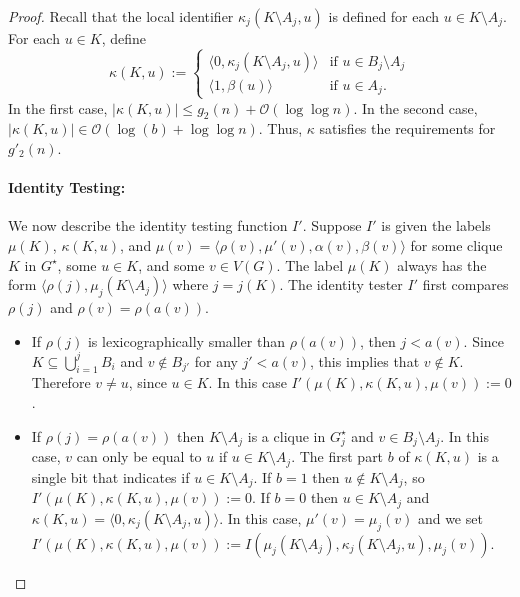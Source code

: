\documentclass{patmorin}
\renewcommand{\le}{\leqslant}
\newcommand{\Oh}{\mathcal{O}}
\begin{document}
\begin{proof}
    Recall that the local identifier $\kappa_j(K\setminus A_j,u)$ is defined for each $u\in K\setminus A_j$.
    For each $u\in K$, define
    \[
         \kappa(K,u):=
         \begin{cases}
           \langle 0,\kappa_j(K\setminus A_j,u)\rangle & \text{if $u\in B_j\setminus A_j$} \\
           \langle 1,\beta(u)\rangle & \text{if $u\in A_j$.}
         \end{cases}
     \]
     In the first case, $|\kappa(K,u)|\le g_2(n)+\Oh(\log\log n)$.
     In the second case, $|\kappa(K,u)|\in \Oh(\log (b)+\log\log n)$.  Thus, $\kappa$ satisfies the requirements for $g'_2(n)$.


     \paragraph{Identity Testing:}
     We now describe the identity testing function $I'$.
     Suppose $I'$ is given the labels $\mu(K)$, $\kappa(K,u)$, and $\mu(v)=\langle \rho(v),\mu'(v),\alpha(v),\beta(v)\rangle$ for some clique $K$ in $G^\star$, some $u\in K$, and some $v\in V(G)$. The label $\mu(K)$ always has the form $\langle\rho(j),\mu_j(K\setminus A_j)\rangle$ where $j=j(K)$.
     The identity tester $I'$ first compares $\rho(j)$ and $\rho(v)=\rho(a(v))$.
     \begin{itemize}
       \item If $\rho(j)$ is lexicographically smaller than $\rho(a(v))$, then $j<a(v)$.  Since $K\subseteq\bigcup_{i=1}^j B_i$ and $v\not\in B_{j'}$ for any $j'<a(v)$, this implies that $v\not\in K$.  Therefore $v\neq u$, since $u\in K$. In this case $I'(\mu(K),\kappa(K,u),\mu(v)):=0$.

       \item If $\rho(j)=\rho(a(v))$ then $K\setminus A_j$ is a clique in $G^\star_j$ and $v\in B_j\setminus A_j$.
       In this case, $v$ can only be equal to $u$ if $u\in K\setminus A_j$.
       The first part $b$ of $\kappa(K,u)$ is a single bit that indicates if $u\in K\setminus A_j$.  If $b=1$ then $u\not\in K\setminus A_j$, so $I'(\mu(K),\kappa(K,u),\mu(v)):=0$.  If $b=0$ then $u\in K\setminus A_j$ and $\kappa(K,u)=\langle 0,\kappa_j(K\setminus A_j,u)\rangle$.
       In this case, $\mu'(v)=\mu_j(v)$ and we set
       $I'(\mu(K),\kappa(K,u),\mu(v)):=I(\mu_j(K\setminus A_j),\kappa_j(K\setminus A_j,u),\mu_j(v))$.


\end{itemize}
\end{proof}
\end{document}

